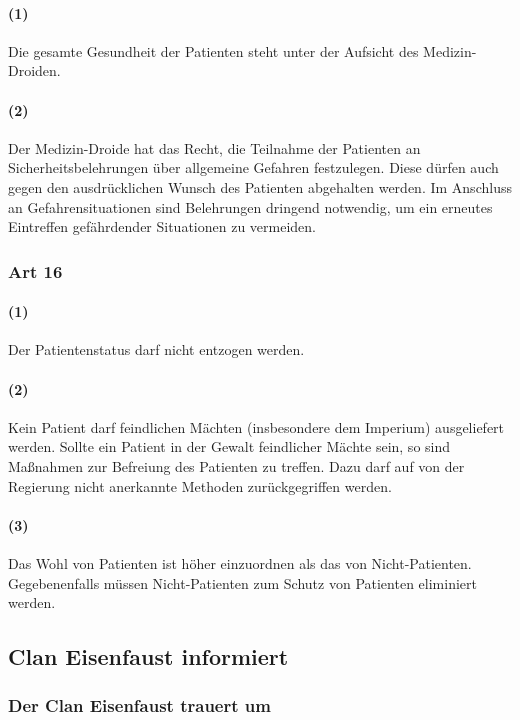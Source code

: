 \paragraph{(1)} Die gesamte Gesundheit der Patienten steht unter der Aufsicht des Medizin-Droiden.
\paragraph{(2)} Der Medizin-Droide hat das Recht, die Teilnahme der Patienten an Sicherheitsbelehrungen über allgemeine Gefahren festzulegen. Diese dürfen auch gegen den ausdrücklichen Wunsch des Patienten abgehalten werden. Im Anschluss an Gefahrensituationen sind Belehrungen dringend notwendig, um ein erneutes Eintreffen gefährdender Situationen zu vermeiden.

\subsubsection{Art 16}
\paragraph{(1)} Der Patientenstatus darf nicht entzogen werden.
\paragraph{(2)} Kein Patient darf feindlichen Mächten (insbesondere dem Imperium) ausgeliefert werden. Sollte ein Patient in der Gewalt feindlicher Mächte sein, so sind Maßnahmen zur Befreiung des Patienten zu treffen. Dazu darf auf von der Regierung nicht anerkannte Methoden zurückgegriffen werden.
\paragraph{(3)} Das Wohl von Patienten ist höher einzuordnen als das von Nicht-Patienten. Gegebenenfalls müssen Nicht-Patienten zum Schutz von Patienten eliminiert werden.


\subsection{Clan Eisenfaust informiert}
\subsubsection{Der Clan Eisenfaust trauert um}

